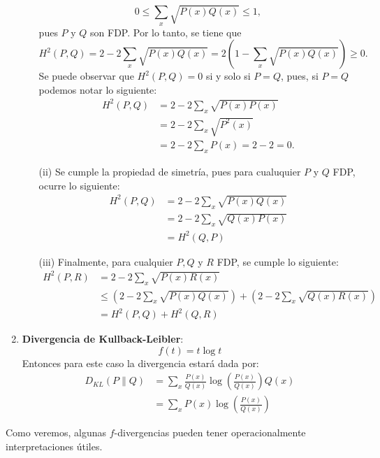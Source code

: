 \begin{example}
\begin{enumerate}[label=(\alph*)]
\begin{enumerate}
\begin{equation*}
            0\leq\sum_{x}\sqrt{P(x)Q(x)}\leq1,
        \end{equation*}
        pues $P$ y $Q$ son FDP. Por lo tanto, se tiene que
        \begin{equation*}
            H^2(P,Q)=2-2\sum_{x}\sqrt{P(x)Q(x)}=2\left(1-\sum_{x}\sqrt{P(x)Q(x)}\right)\geq0.
        \end{equation*}
        Se puede observar que $H^2(P,Q)=0$ si y solo si $P=Q$, pues, si $P=Q$ podemos notar lo siguiente:
        \begin{align*}
            H^2(P,Q)&=2-2\sum_{x}\sqrt{P(x)P(x)}\\
            &=2-2\sum_{x}\sqrt{P^2(x)}\\
            &=2-2\sum_{x}P(x)=2-2=0.
        \end{align*}
        \item[(ii)] Se cumple la propiedad de simetr\'ia, pues para cualuquier $P$ y $Q$ FDP, ocurre lo siguiente:
        \begin{align*}
            H^2(P,Q)&=2-2\sum_{x}\sqrt{P(x)Q(x)}\\
            &=2-2\sum_{x}\sqrt{Q(x)P(x)}\\
            &=H^2(Q,P)
        \end{align*}
        \item[(iii)] Finalmente, para cualquier $P,Q$ y $R$ FDP, se cumple lo siguiente:
        \begin{align*}
            H^2(P,R)&=2-2\sum_{x}\sqrt{P(x)R(x)}\\
            &\leq\left(2-2\sum_{x}\sqrt{P(x)Q(x)}\right)+\left(2-2\sum_{x}\sqrt{Q(x)R(x)}\right)\\
            &=H^2(P,Q)+H^2(Q,R)
        \end{align*}
    \end{enumerate}
    \item \textbf{Divergencia de Kullback-Leibler}: 
    \begin{equation*}
        f(t)=t\log{t}
    \end{equation*}
    Entonces para este caso la divergencia estar\'a dada por:
    \begin{align}
        D_{KL}(P\|Q)&=\sum_x\frac{P(x)}{Q(x)}\log\left(\frac{P(x)}{Q(x)}\right)Q(x)\nonumber\\
        &=\sum_xP(x)\log\left(\frac{P(x)}{Q(x)}\right)\label{eq:KL}
    \end{align}
\end{enumerate}
Como veremos, algunas $f$-divergencias pueden tener operacionalmente interpretaciones \'utiles.  
\end{example}

